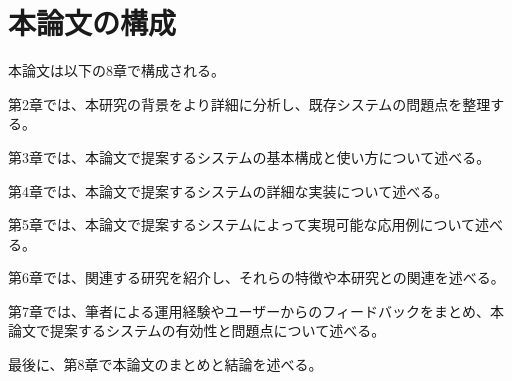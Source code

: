 \newpage

\section{本論文の構成}

本論文は以下の8章で構成される。

第2章では、本研究の背景をより詳細に分析し、既存システムの問題点を整理する。

第3章では、本論文で提案するシステムの基本構成と使い方について述べる。

第4章では、本論文で提案するシステムの詳細な実装について述べる。

第5章では、本論文で提案するシステムによって実現可能な応用例について述べる。

第6章では、関連する研究を紹介し、それらの特徴や本研究との関連を述べる。

第7章では、筆者による運用経験やユーザーからのフィードバックをまとめ、本論文で提案するシステムの有効性と問題点について述べる。

最後に、第8章で本論文のまとめと結論を述べる。